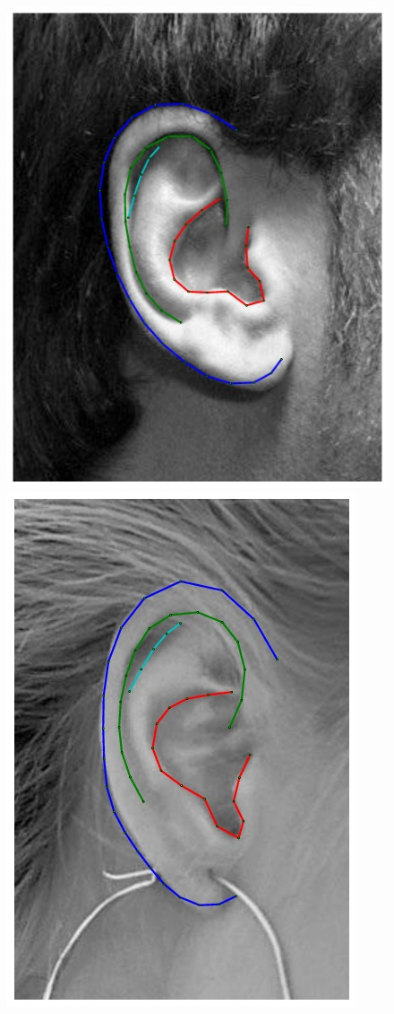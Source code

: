 \begin{figure}
    \hfill
    \includegraphics[height=\flowh]{resources/Ear_Deformable_Model/fittings/final_0001}
    \hfill
    \includegraphics[height=\flowh]{resources/Ear_Deformable_Model/fittings/final_0011}

\end{figure}
